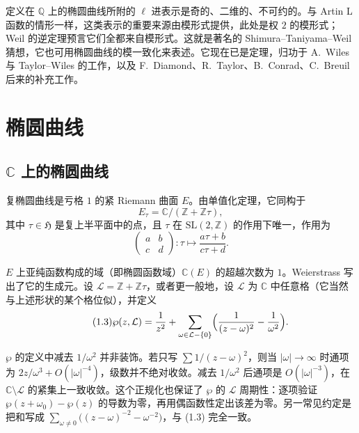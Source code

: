 定义在 $\mathbb{Q}$ 上的椭圆曲线所附的 $\ell$ 进表示是奇的、二维的、不可约的。与 Artin L 函数的情形一样，这类表示的重要来源由模形式提供，此处是权 $2$ 的模形式；Weil 的逆定理预言它们全都来自模形式。这就是著名的 Shimura--Taniyama--Weil 猜想，它也可用椭圆曲线的模一致化来表述。它现在已是定理，归功于 A.~Wiles 与 Taylor--Wiles 的工作，以及 F.~Diamond、R.~Taylor、B.~Conrad、C.~Breuil 后来的补充工作。

\section{椭圆曲线}\label{c5:sec:1}

\subsection{$\mathbb{C}$ 上的椭圆曲线}\label{c5:sec:1.1}

复椭圆曲线是亏格 $1$ 的紧 Riemann 曲面 $E$。由单值化定理，它同构于
\begin{equation}\tag{1.1}\label{c5:eq:1.1}
E_\tau=\mathbb{C}/(\mathbb{Z}+\mathbb{Z}\tau),
\end{equation}
其中 $\tau\in\mathfrak{H}$ 是复上半平面中的点，且 $\tau$ 在 $\mathrm{SL}(2,\mathbb{Z})$ 的作用下唯一，作用为
\begin{equation}\tag{1.2}\label{c5:eq:1.2}
\begin{pmatrix}a&b\\ c&d\end{pmatrix}:\tau\longmapsto\frac{a\tau+b}{c\tau+d}.
\end{equation}

$E$ 上亚纯函数构成的域（即椭圆函数域）$\mathbb{C}(E)$ 的超越次数为 $1$。Weierstrass 写出了它的生成元。设 $\mathcal{L}=\mathbb{Z}+\mathbb{Z}\tau$，或者更一般地，设 $\mathcal{L}$ 为 $\mathbb{C}$ 中任意格（它当然与上述形状的某个格位似），并定义
\begin{equation}\tag{1.3}\label{c5:eq:1.3}
\wp(z,\mathcal{L})=\frac{1}{z^2}+\sum_{\omega\in\mathcal{L}-\{0\}}\Bigl(\frac{1}{(z-\omega)^2}-\frac{1}{\omega^2}\Bigr).
\end{equation}

\begin{annote}
$\wp$ 的定义中减去 $1/\omega^2$ 并非装饰。若只写 $\sum 1/(z-\omega)^2$，则当 $|\omega|\to\infty$ 时通项为 $2z/\omega^3+O(|\omega|^{-4})$，级数并不绝对收敛。减去 $1/\omega^2$ 后通项是 $O(|\omega|^{-3})$，在 $\mathbb{C}\setminus\mathcal{L}$ 的紧集上一致收敛。这个正规化也保证了 $\wp$ 的 $\mathcal{L}$ 周期性：逐项验证 $\wp(z+\omega_0)-\wp(z)$ 的导数为零，再用偶函数性定出该差为零。另一常见约定是把和写成 $\sum_{\omega\neq0}\bigl((z-\omega)^{-2}-\omega^{-2}\bigr)$，与 (1.3) 完全一致。
\par\vspace{0.15em}{\raggedleft 【来源：Silverman《The Arithmetic of Elliptic Curves》第 VI 章（A）；Lang《Elliptic Functions》第 1 章（A）】\par}
\end{annote}

